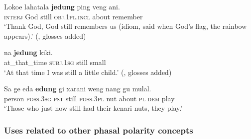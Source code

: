 \begin{exe}
	\ex\label{exAppendixBlagar1}
	\gll Lokoe lahatala \textbf{jedung} ping veng ani.\\
	\textsc{interj} God still \textsc{obj}.1\textsc{pl}.\textsc{incl} about remember\\
	\glt \lq Thank God, God still remembers us (idiom, said when God's flag, the rainbow appears).' (\cite[207]{SteinhauerGomang2016}, glosses added)

	\ex\label{exAppendixBlagar2}
	 na \textbf{jedung} kiki.\\
	at\_that\_time \textsc{subj}.1\textsc{sg} still small\\
	\glt \lq At that time I was still a little child.' (\cite[195]{SteinhauerGomang2016}, glosses added)
		
	\ex\label{exAppendixBlagar3}
	\gll Sa ge eda \textbf{edung} gi xarani weng nang gu mulal.\\
	person \textsc{poss}.3\textsc{sg} \textsc{pst} still \textsc{poss}.3\textsc{pl} nut about \textsc{pl} \textsc{dem} play\\
	\glt \lq Those who just now still had their kenari nuts, they play.'
	\\ \parencite[185]{SteinhauerBukalabang}
\end{exe}

\subsubsection{Uses related to other phasal polarity concepts}
